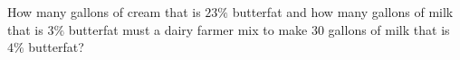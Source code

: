 How many gallons of cream that is $23\%$ butterfat and how many gallons of milk that is $3\%$ butterfat must a dairy farmer mix to make $30$ gallons of milk that is $4\%$ butterfat?
